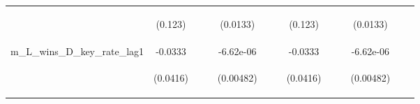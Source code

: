 \documentclass[]{article}
\begin{document}
\begin{center}
\begin{tabular}{lcccccccccccc}
\vspace{4pt} & \begin{footnotesize}(0.123)\end{footnotesize} & \begin{footnotesize}\end{footnotesize} & \begin{footnotesize}\end{footnotesize} & \begin{footnotesize}(0.0133)\end{footnotesize} & \begin{footnotesize}\end{footnotesize} & \begin{footnotesize}\end{footnotesize} & \begin{footnotesize}(0.123)\end{footnotesize} & \begin{footnotesize}\end{footnotesize} & \begin{footnotesize}\end{footnotesize} & \begin{footnotesize}(0.0133)\end{footnotesize} & \begin{footnotesize}\end{footnotesize} & \begin{footnotesize}\end{footnotesize} \\
m\_L\_wins\_D\_key\_rate\_lag1 & -0.0333 &  &  & -6.62e-06 &  &  & -0.0333 &  &  & -6.62e-06 &  &  \\
\vspace{4pt} & \begin{footnotesize}(0.0416)\end{footnotesize} & \begin{footnotesize}\end{footnotesize} & \begin{footnotesize}\end{footnotesize} & \begin{footnotesize}(0.00482)\end{footnotesize} & \begin{footnotesize}\end{footnotesize} & \begin{footnotesize}\end{footnotesize} & \begin{footnotesize}(0.0416)\end{footnotesize} & \begin{footnotesize}\end{footnotesize} & \begin{footnotesize}\end{footnotesize} & \begin{footnotesize}(0.00482)\end{footnotesize} & \begin{footnotesize}\end{footnotesize} & \begin{footnotesize}\end{footnotesize} \\

\end{tabular}
\end{center}
\end{document}
